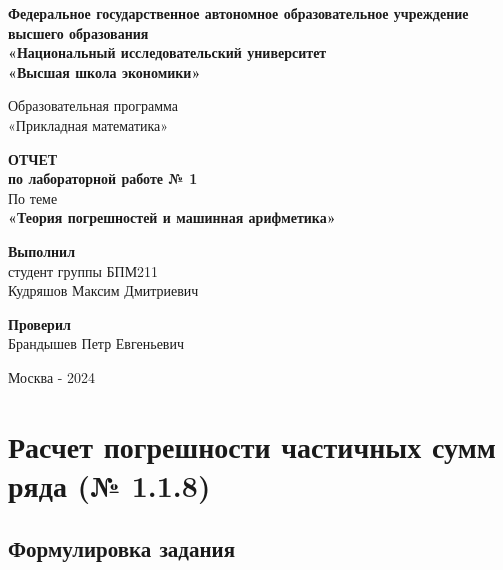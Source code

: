 \documentclass[a4paper,11pt]{article}
\theoremstyle{definition} %
\theoremstyle{remark} %
\begin{document}
\begin{titlepage} %
\pagestyle{empty}
\begin{center}

\Large
\textbf{Федеральное государственное автономное образовательное учреждение высшего образования\\
«Национальный исследовательский университет\\
«Высшая школа экономики»}\\
\vspace{5mm}

\Large
Образовательная программа \\
«Прикладная математика»
\vspace{40mm}

\Large
\textbf{ОТЧЕТ} \\
\textbf{по лабораторной работе № 1} \\
\vspace{5mm}
\Large
По теме \\
\LARGE\textbf{«Теория погрешностей и машинная арифметика»}
\end{center}

\begin{center}
\vfill

\large
\begin{flushright}
\textbf{Выполнил} \\
студент группы БПМ211 \\
Кудряшов Максим Дмитриевич \\
\end{flushright}

\large
\begin{flushright}
\textbf{Проверил} \\
Брандышев Петр Евгеньевич \\
\end{flushright}

\large
\vspace{20mm}
Москва - 2024
\end{center}
\end{titlepage} %

\newpage
\tableofcontents
\newpage

\section{Расчет погрешности частичных сумм ряда (№ 1.1.8)}

\subsection{Формулировка задания}
\end{document}
